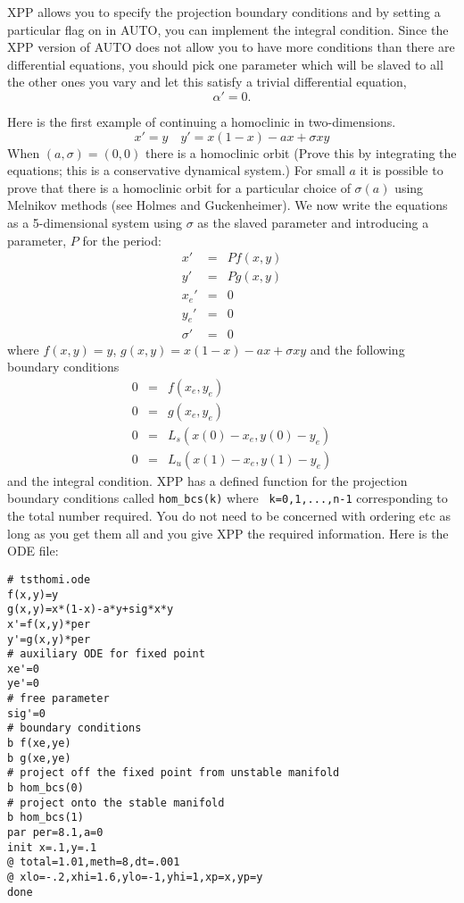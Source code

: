 \documentclass{article}
\begin{document}
XPP allows you to specify the projection boundary conditions and by
setting a particular flag on in AUTO, you can implement the integral
condition.  Since the XPP version of AUTO does not allow you to have
more conditions than there are differential equations, you should pick
one parameter which will be slaved to all the other ones you vary and
let this satisfy a trivial differential equation,
\[
\alpha'=0.
\]

Here is the first example of continuing a homoclinic in
two-dimensions.
\[
x'=y \quad y'=x(1-x)-ax+\sigma xy
\]
When $(a,\sigma)=(0,0)$ there is a homoclinic orbit (Prove this by
integrating the equations; this is a conservative dynamical system.)
For small $a$ it is possible to prove that there is a homoclinic orbit
for a particular choice of $\sigma(a)$ using Melnikov methods (see
Holmes and Guckenheimer).  We now write the equations as a
5-dimensional system using $\sigma$ as the slaved parameter and
introducing a parameter, $P$ for the period:
\begin{eqnarray*}
x' &=& P f(x,y) \\
y' &=& P g(x,y)  \\
x_e' &=& 0 \\
y_e' &=& 0   \\
\sigma' &=& 0
\end{eqnarray*}
where $f(x,y)=y$, $g(x,y)=x(1-x)-ax+\sigma xy $ and the following
boundary conditions
\begin{eqnarray*}
0 &=& f(x_e,y_e) \\
0 &=& g(x_e,y_e) \\
0 &=& L_s (x(0)-x_e,y(0)-y_e)      \\
0 &=& L_u (x(1)-x_e,y(1)-y_e)
\end{eqnarray*}
and the integral condition.  XPP has a defined function for the
projection boundary conditions called {\tt hom\_bcs(k)} where {\tt
k=0,1,...,n-1} corresponding to the total number required. You do not
need to be concerned with ordering etc as long as you get them all and
you give XPP the required information. Here is the ODE file:
\begin{verbatim}
# tsthomi.ode
f(x,y)=y
g(x,y)=x*(1-x)-a*y+sig*x*y
x'=f(x,y)*per
y'=g(x,y)*per
# auxiliary ODE for fixed point
xe'=0
ye'=0
# free parameter
sig'=0
# boundary conditions
b f(xe,ye)
b g(xe,ye)
# project off the fixed point from unstable manifold
b hom_bcs(0)
# project onto the stable manifold
b hom_bcs(1)
par per=8.1,a=0
init x=.1,y=.1
@ total=1.01,meth=8,dt=.001
@ xlo=-.2,xhi=1.6,ylo=-1,yhi=1,xp=x,yp=y
done
\end{verbatim}
\end{document}
